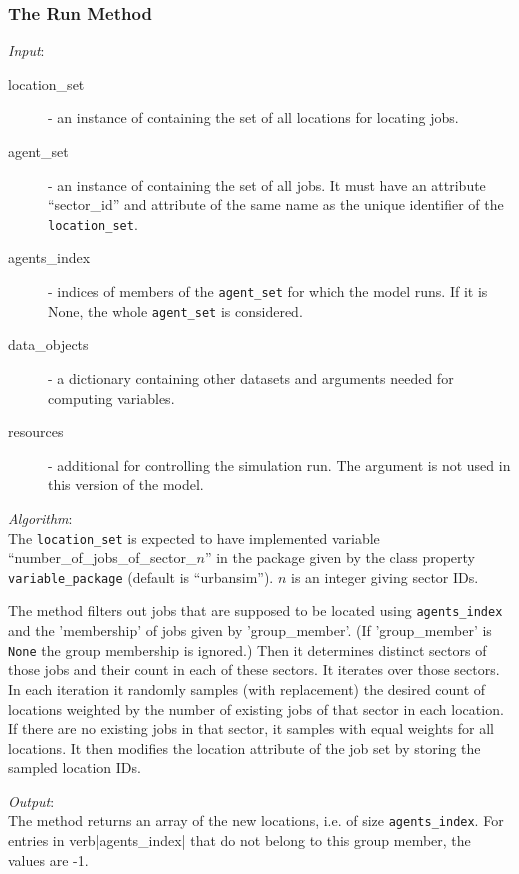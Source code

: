 \subsubsection{The Run Method}
%
{\it Input}:
\begin{description}
\item[location_set] - an instance of  containing the set of all
  locations for locating jobs.
\item[agent_set] - an instance of  containing the set of all
  jobs. It must have an attribute ``sector_id'' and attribute of the same name
  as the unique identifier of the \verb|location_set|.
\item[agents_index] - indices of members of the \verb|agent_set| for which the
  model runs. If it is None, the whole \verb|agent_set| is considered.
\item[data_objects] - a dictionary containing other datasets and arguments
  needed for computing variables.
\item[resources] - additional  for controlling the
  simulation run. The argument is not used in this version of the model. 
\end{description}

{\it Algorithm}:~\\[1mm]
The \verb|location_set| is expected to have implemented variable
 ``number_of_jobs_of_sector_$n$'' in the package
given by the class property \verb|variable_package| (default is
``urbansim'').  $n$ is an integer giving sector IDs.

The method filters out jobs that are supposed to be located using \verb|agents_index| and 
the 'membership' of jobs given by 'group_member'. (If 'group_member' is \verb|None| the group membership is ignored.)
Then it determines distinct sectors of those jobs and their count in each of
these sectors. It iterates over those sectors. In each iteration it
randomly samples (with replacement) the desired count of locations
weighted by the number of existing jobs of that sector in each
location. If there are no existing jobs in that sector, it samples
with equal weights for all locations.  It then modifies the location
attribute of the job set by storing the sampled
location IDs.

{\it Output}:~\\[1mm]
The method returns an array of the new locations, i.e. of size
\verb|agents_index|. For entries in verb|agents_index| that do not belong to this group member, the values are -1.

